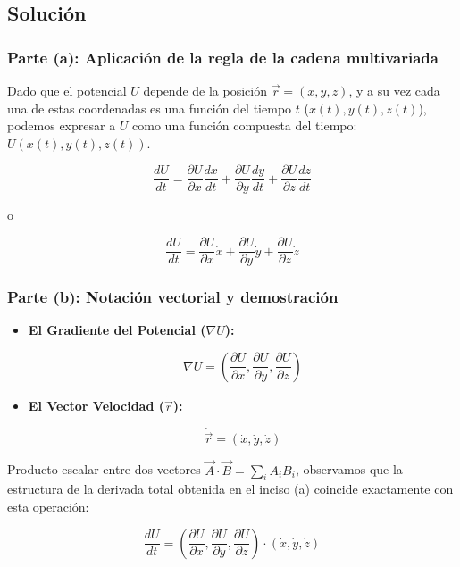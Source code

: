 \documentclass[12pt, letterpaper]{article}
\begin{document}
\subsection{Solución}

\subsubsection*{Parte (a): Aplicación de la regla de la cadena multivariada}

Dado que el potencial $U$ depende de la posición $\vec{r} = (x, y, z)$, y a su vez cada una de estas coordenadas es una función del tiempo $t$ ($x(t), y(t), z(t)$), podemos expresar a $U$ como una función compuesta del tiempo: $U(x(t), y(t), z(t))$.

$$ \frac{dU}{dt} = \frac{\partial U}{\partial x} \frac{dx}{dt} + \frac{\partial U}{\partial y} \frac{dy}{dt} + \frac{\partial U}{\partial z} \frac{dz}{dt} $$

o

$$ \frac{dU}{dt} = \frac{\partial U}{\partial x} \dot{x} + \frac{\partial U}{\partial y} \dot{y} + \frac{\partial U}{\partial z} \dot{z} $$


\subsubsection*{Parte (b): Notación vectorial y demostración}

\begin{itemize}

	\item \textbf{El Gradiente del Potencial ($\nabla U$):} 
	
$$ \nabla U = \left( \frac{\partial U}{\partial x}, \frac{\partial U}{\partial y}, \frac{\partial U}{\partial z} \right) $$

	\item \textbf{El Vector Velocidad ($\dot{\vec{r}}$):} 
	
$$ \dot{\vec{r}} = (\dot{x}, \dot{y}, \dot{z}) $$

\end{itemize}

Producto escalar entre dos vectores $\vec{A} \cdot \vec{B} = \sum_{i} A_i B_i$, observamos que la estructura de la derivada total obtenida en el inciso (a) coincide exactamente con esta operación:

$$ \frac{dU}{dt} = \left( \frac{\partial U}{\partial x}, \frac{\partial U}{\partial y}, \frac{\partial U}{\partial z} \right) \cdot (\dot{x}, \dot{y}, \dot{z}) $$
\end{document}
